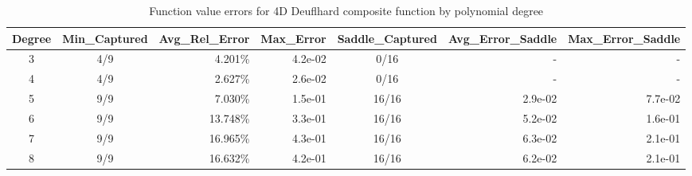 \begin{table}[htbp]
\centering
\caption{Function value errors for 4D Deuflhard composite function by polynomial degree}
\label{tab:deuflhard_4d_errors}
\begin{tabular}{ccrrcrr}
  \toprule
  \textbf{Degree} & \textbf{Min\_Captured} & \textbf{Avg\_Rel\_Error} & \textbf{Max\_Error} & \textbf{Saddle\_Captured} & \textbf{Avg\_Error\_Saddle} & \textbf{Max\_Error\_Saddle} \\\midrule
  3 & 4/9 & 4.201\% & 4.2e-02 & 0/16 & - & - \\
  4 & 4/9 & 2.627\% & 2.6e-02 & 0/16 & - & - \\
  5 & 9/9 & 7.030\% & 1.5e-01 & 16/16 & 2.9e-02 & 7.7e-02 \\
  6 & 9/9 & 13.748\% & 3.3e-01 & 16/16 & 5.2e-02 & 1.6e-01 \\
  7 & 9/9 & 16.965\% & 4.3e-01 & 16/16 & 6.3e-02 & 2.1e-01 \\
  8 & 9/9 & 16.632\% & 4.2e-01 & 16/16 & 6.2e-02 & 2.1e-01 \\\bottomrule
\end{tabular}
\end{table}
